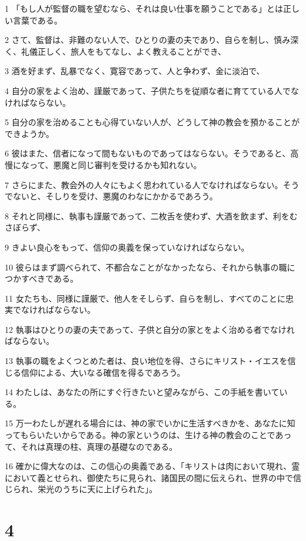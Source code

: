 \par 1 「もし人が監督の職を望むなら、それは良い仕事を願うことである」とは正しい言葉である。
\par 2 さて、監督は、非難のない人で、ひとりの妻の夫であり、自らを制し、慎み深く、礼儀正しく、旅人をもてなし、よく教えることができ、
\par 3 酒を好まず、乱暴でなく、寛容であって、人と争わず、金に淡泊で、
\par 4 自分の家をよく治め、謹厳であって、子供たちを従順な者に育てている人でなければならない。
\par 5 自分の家を治めることも心得ていない人が、どうして神の教会を預かることができようか。
\par 6 彼はまた、信者になって間もないものであってはならない。そうであると、高慢になって、悪魔と同じ審判を受けるかも知れない。
\par 7 さらにまた、教会外の人々にもよく思われている人でなければならない。そうでないと、そしりを受け、悪魔のわなにかかるであろう。
\par 8 それと同様に、執事も謹厳であって、二枚舌を使わず、大酒を飲まず、利をむさぼらず、
\par 9 きよい良心をもって、信仰の奥義を保っていなければならない。
\par 10 彼らはまず調べられて、不都合なことがなかったなら、それから執事の職につかすべきである。
\par 11 女たちも、同様に謹厳で、他人をそしらず、自らを制し、すべてのことに忠実でなければならない。
\par 12 執事はひとりの妻の夫であって、子供と自分の家とをよく治める者でなければならない。
\par 13 執事の職をよくつとめた者は、良い地位を得、さらにキリスト・イエスを信じる信仰による、大いなる確信を得るであろう。
\par 14 わたしは、あなたの所にすぐ行きたいと望みながら、この手紙を書いている。
\par 15 万一わたしが遅れる場合には、神の家でいかに生活すべきかを、あなたに知ってもらいたいからである。神の家というのは、生ける神の教会のことであって、それは真理の柱、真理の基礎なのである。
\par 16 確かに偉大なのは、この信心の奥義である、「キリストは肉において現れ、霊において義とせられ、御使たちに見られ、諸国民の間に伝えられ、世界の中で信じられ、栄光のうちに天に上げられた」。

\chapter{4}

